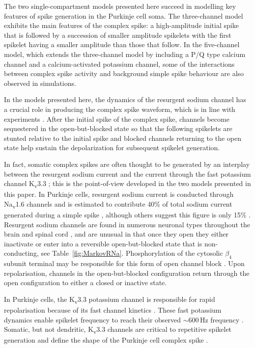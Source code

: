 \documentclass[utf8]{frontiersSCNS} %
\newcommand{\hz}{\,\mathrm{Hz}}
\begin{document}
The two single-compartment models presented here succeed in modelling
key features of spike generation in the Purkinje cell soma. The
three-channel model exhibits the main features of the complex spike: a
high-amplitude initial spike that is followed by a succession of
smaller amplitude spikelets with the first spikelet having a smaller
amplitude than those that follow. In the five-channel model, which
extends the three-channel model by including a P/Q type calcium
channel and a calcium-activated potassium channel, some of the
interactions between complex spike activity and background simple
spike behaviour are also observed in simulations.

In the models presented here, the dynamics of the resurgent sodium
channel has a crucial role in producing the complex spike waveform, which is in line with experiments \cite{RamanBean1997}. After the initial spike of the complex spike, channels become sequestered in the open-but-blocked state so that the following spikelets
are stunted relative to the initial spike and blocked channels
returning to the open state help sustain the depolarization for subsequent spikelet generation.

In fact, somatic complex spikes are often thought to be generated by
an interplay between the resurgent sodium current
\cite{RamanBean1997,RamanBean2001,KhaliqEtAl2003,KhaliqRaman2006} and
the current through the fast potassium channel K\textsubscript{v}3.3
\cite{ZaghaEtAl2008,HurlockEtAl2008,VeysEtAl2013}; this is the
point-of-view developed in the two models presented in this paper. In
Purkinje cells, resurgent sodium current is conducted through
Na\textsubscript{v}1.6 channels \cite{RamanBean1997} and is estimated
to contribute 40\% of total sodium current generated during a simple
spike \cite{RamanBean2001}, although others suggest this figure is
only 15\% \cite{LevinEtAl2006}. Resurgent sodium channels are found in
numerous neuronal types throughout the brain and spinal cord
\cite{OsorioEtAl2010}, and are unusual in that once they open they
either inactivate or enter into a reversible open-but-blocked state
that is non-conducting, see Table~\ref{fig:MarkovRNa}. Phosphorylation
of the cytosolic $\beta_4$ subunit terminal may be responsible for
this form of open channel block \cite{GriecoEtAl2002}. Upon
repolarisation, channels in the open-but-blocked configuration return
through the open configuration to either a closed or inactive
state.

In Purkinje cells, the K\textsubscript{v}3.3 potassium channel is
responsible for rapid repolarisation \cite{VeysEtAl2013} because of
its fast channel kinetics
\cite{RudyEtAl1999,RudyMcBain2001}. These fast potassium dynamics
enable spikelet frequency to reach their observed $\sim 600\hz$
frequency \cite{WarnaarEtAl2015,BurroughsEtAl2016}. Somatic, but not
dendritic, K\textsubscript{v}3.3 channels are critical to repetitive
spikelet generation and define the shape of the Purkinje cell complex
spike \cite{HurlockEtAl2008,ZaghaEtAl2008,VeysEtAl2013}.
\end{document}
